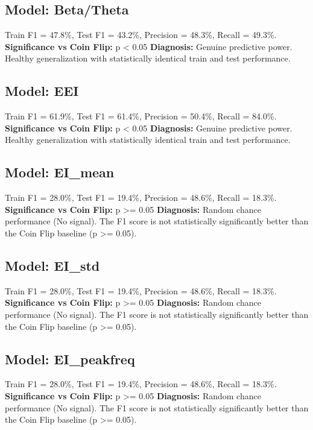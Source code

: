 \subsection*{Model: Beta/Theta}
Train F1 = 47.8\%, Test F1 = 43.2\%, Precision = 48.3\%, Recall = 49.3\%.
\newline
\textbf{Significance vs Coin Flip:} p < 0.05
\newline
\textbf{Diagnosis:} Genuine predictive power. Healthy generalization with statistically identical train and test performance.

\subsection*{Model: EEI}
Train F1 = 61.9\%, Test F1 = 61.4\%, Precision = 50.4\%, Recall = 84.0\%.
\newline
\textbf{Significance vs Coin Flip:} p < 0.05
\newline
\textbf{Diagnosis:} Genuine predictive power. Healthy generalization with statistically identical train and test performance.

\subsection*{Model: EI_mean}
Train F1 = 28.0\%, Test F1 = 19.4\%, Precision = 48.6\%, Recall = 18.3\%.
\newline
\textbf{Significance vs Coin Flip:} p >= 0.05
\newline
\textbf{Diagnosis:} Random chance performance (No signal). The F1 score is not statistically significantly better than the Coin Flip baseline (p >= 0.05).

\subsection*{Model: EI_std}
Train F1 = 28.0\%, Test F1 = 19.4\%, Precision = 48.6\%, Recall = 18.3\%.
\newline
\textbf{Significance vs Coin Flip:} p >= 0.05
\newline
\textbf{Diagnosis:} Random chance performance (No signal). The F1 score is not statistically significantly better than the Coin Flip baseline (p >= 0.05).

\subsection*{Model: EI_peakfreq}
Train F1 = 28.0\%, Test F1 = 19.4\%, Precision = 48.6\%, Recall = 18.3\%.
\newline
\textbf{Significance vs Coin Flip:} p >= 0.05
\newline
\textbf{Diagnosis:} Random chance performance (No signal). The F1 score is not statistically significantly better than the Coin Flip baseline (p >= 0.05).

